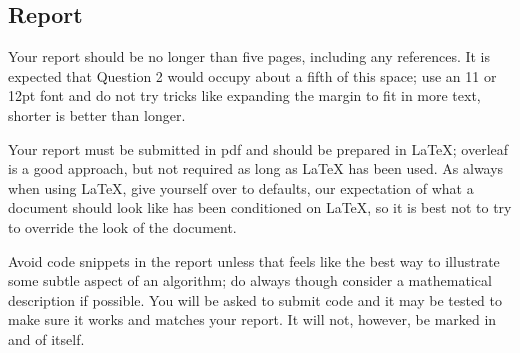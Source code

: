 \documentclass[12pt]{article}
\begin{document}
\subsection*{Report}

Your report should be no longer than five pages, including any
references. It is expected that Question 2 would occupy about a fifth
of this space; use an 11 or 12pt font and do not try tricks like
expanding the margin to fit in more text, shorter is better than
longer.

Your report must be submitted in pdf and should be prepared in LaTeX;
overleaf is a good approach, but not required as long as LaTeX has
been used. As always when using LaTeX, give yourself over to defaults,
our expectation of what a document should look like has been
conditioned on LaTeX, so it is best not to try to override the look of
the document.

Avoid code snippets in the report unless that feels like the best way
to illustrate some subtle aspect of an algorithm; do always though
consider a mathematical description if possible. You will be asked to
submit code and it may be tested to make sure it works and matches
your report. It will not, however, be marked in and of itself.
\end{document}
